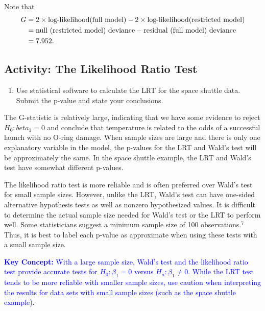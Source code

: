 \documentclass[
]{book}
\providecommand{\tightlist}{%
  \setlength{\itemsep}{0pt}\setlength{\parskip}{0pt}}
\begin{document}
Note that
\begin{align}
G &= 2 \times \text{log-likelihood(full model)} - 2 \times \text{log-likelihood(restricted model)} \notag \\
&= \text{null (restricted model) deviance} - \text{residual (full model) deviance} \notag \\
&= 7.952. \notag 
\end{align}

\hypertarget{activity-the-likelihood-ratio-test}{%
\subsection*{Activity: The Likelihood Ratio Test}\label{activity-the-likelihood-ratio-test}}

\begin{enumerate}
\def\labelenumi{\arabic{enumi}.}
\setcounter{enumi}{13}
\tightlist
\item
  Use statistical software to calculate the LRT for the space shuttle data. Submit the p-value and state your conclusions.
\end{enumerate}

The G-statistic is relatively large, indicating that we have some evidence to reject \(H_0: beta_1 = 0\) and conclude that temperature is related to the odds of a successful launch with no O-ring damage. When sample sizes are large and there is only one explanatory variable in the model, the p-values for the LRT and Wald's test will be approximately the same. In the space shuttle example, the LRT and Wald's test have somewhat different p-values.

The likelihood ratio test is more reliable and is often preferred over Wald's test for small sample sizes. However, unlike the LRT, Wald's test can have one-sided alternative hypothesis tests as well as nonzero hypothesized values. It is difficult to determine the actual sample size needed for Wald's test or the LRT to perform well. Some statisticians suggest a minimum sample size of 100 observations.\(^7\) Thus, it is best to label each p-value as approximate when using these tests with a small sample size.

\textbf{\textcolor{blue}{Key Concept:}}
\textcolor{blue}{With a large sample size, Wald’s test and the likelihood ratio test provide accurate tests for $H_0: \beta_1 = 0$ versus $H_a: \beta_1 \neq 0$. While the LRT test tends to be more reliable with smaller sample sizes, use caution when interpreting the results for data sets with small sample sizes (such as the space shuttle example).}
\end{document}
